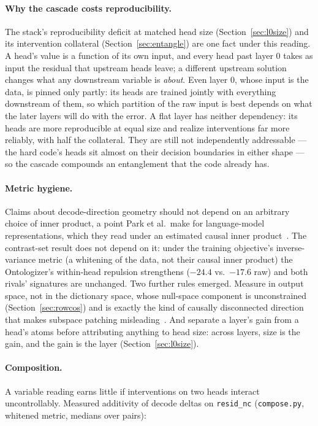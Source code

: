 \paragraph{Why the cascade costs reproducibility.} The stack's
reproducibility deficit at matched head size
(Section~\ref{sec:l0size}) and its intervention collateral
(Section~\ref{sec:entangle}) are one fact under this reading. A head's
value is a function of its own input, and every head past layer 0 takes
as input the residual that upstream heads leave; a different upstream
solution changes what any downstream variable is \emph{about}. Even layer
0, whose input is the data, is pinned only partly: its heads are trained
jointly with everything downstream of them, so which partition of the raw
input is best depends on what the later layers will do with the error.
A flat layer has neither dependency: its heads are more reproducible at
equal size and realize interventions far more reliably, with half the
collateral. They are still not independently addressable --- the hard
code's heads sit almost on their decision boundaries in either shape ---
so the cascade compounds an entanglement that the code already has.

\paragraph{Metric hygiene.}
Claims about decode-direction geometry should not depend on an arbitrary
choice of inner product, a point Park et al.\ make for language-model
representations, which they read under an estimated causal inner
product~\cite{park2025}. The contrast-set result does not depend on it:
under the
training objective's inverse-variance metric (a whitening of the data,
not their causal inner product) the Ontologizer's
within-head repulsion strengthens ($-24.4$ vs.\ $-17.6$ raw) and both
rivals' signatures are unchanged. Two further rules emerged. Measure in
output space, not in the dictionary space, whose null-space component is
unconstrained (Section~\ref{sec:rowcos}) and is exactly the kind of
causally disconnected direction that makes subspace patching
misleading~\cite{makelov2023}. And separate a layer's gain
from a head's atoms before attributing anything to head size: across
layers, size is the gain, and the gain is the layer
(Section~\ref{sec:l0size}).

\paragraph{Composition.}
A variable reading earns little if interventions on two heads interact
uncontrollably. Measured additivity of decode deltas on
\texttt{resid\_nc} (\texttt{compose.py}, whitened metric, medians over
pairs):

